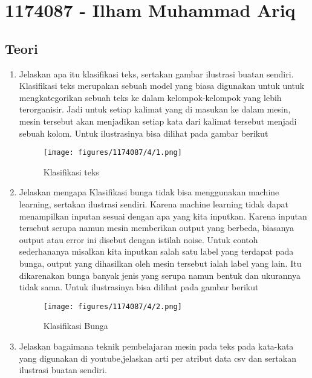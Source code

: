 \section{1174087 - Ilham Muhammad Ariq}
\subsection{Teori}
\begin{enumerate}

	\item Jelaskan apa itu klasifikasi teks, sertakan gambar ilustrasi buatan sendiri.
	\hfill\break
	Klasifikasi teks merupakan sebuah model yang biasa digunakan untuk untuk mengkategorikan sebuah teks ke dalam kelompok-kelompok yang lebih terorganisir. Jadi untuk setiap kalimat yang di masukan ke dalam mesin, mesin tersebut akan menjadikan setiap kata dari kalimat tersebut menjadi sebuah kolom. Untuk ilustrasinya bisa dilihat pada gambar berikut 

	\begin{figure}[H]
	\centering
		\texttt{[image: figures/1174087/4/1.png]}
		\caption{Klasifikasi teks}
	\end{figure}
	
	\item Jelaskan mengapa Klasifikasi bunga tidak bisa menggunakan machine learning, sertakan ilustrasi sendiri.	
	\hfill\break
	Karena machine learning tidak dapat menampilkan inputan sesuai dengan apa yang kita inputkan. Karena inputan tersebut serupa namun mesin memberikan output yang berbeda, biasanya output atau error ini disebut dengan istilah noise. Untuk contoh sederhananya misalkan kita inputkan salah satu label yang terdapat pada bunga, output yang dihasilkan oleh mesin tersebut ialah label yang lain. Itu dikarenakan bunga banyak jenis yang serupa namun bentuk dan ukurannya tidak sama. Untuk ilustrasinya bisa dilihat pada gambar berikut 

	\begin{figure}[H]
	\centering
		\texttt{[image: figures/1174087/4/2.png]}
		\caption{Klasifikasi Bunga}
	\end{figure}

	\item Jelaskan bagaimana teknik pembelajaran mesin pada teks pada kata-kata yang digunakan di youtube,jelaskan arti per atribut data csv dan sertakan ilustrasi buatan sendiri.


\end{enumerate}
